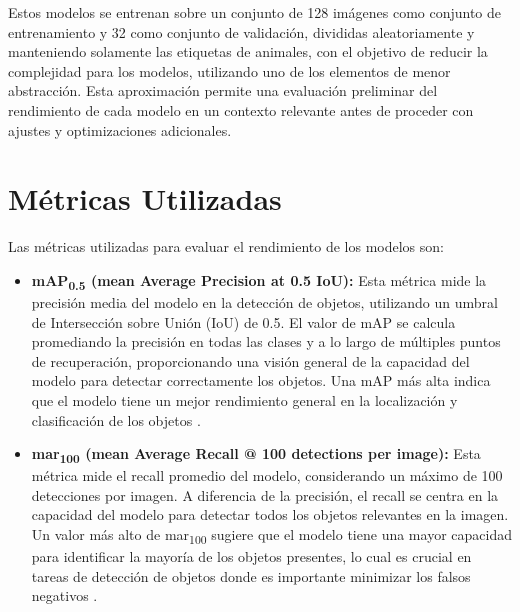Estos modelos se entrenan sobre un conjunto de 128 imágenes como conjunto de entrenamiento y 32 como conjunto de validación, divididas aleatoriamente y manteniendo solamente las etiquetas de animales, con el objetivo de reducir la complejidad para los modelos, utilizando uno de los elementos de menor abstracción.
Esta aproximación permite una evaluación preliminar del rendimiento de cada modelo en un contexto relevante antes de proceder con ajustes y optimizaciones adicionales.

\section{Métricas Utilizadas}

Las métricas utilizadas para evaluar el rendimiento de los modelos son:

\begin{itemize}
    \item \textbf{mAP\textsubscript{0.5} (mean Average Precision at 0.5 IoU):}
    Esta métrica mide la precisión media del modelo en la detección de objetos, utilizando un umbral de Intersección sobre Unión (IoU) de 0.5.
    El valor de mAP se calcula promediando la precisión en todas las clases y a lo largo de múltiples puntos de recuperación, proporcionando una visión general de la capacidad del modelo para detectar correctamente los objetos.
    Una mAP más alta indica que el modelo tiene un mejor rendimiento general en la localización y clasificación de los objetos \cite{lin2014microsoft,everingham2010pascal}.

    \item \textbf{mar\textsubscript{100} (mean Average Recall @ 100 detections per image):}
    Esta métrica mide el recall promedio del modelo, considerando un máximo de 100 detecciones por imagen.
    A diferencia de la precisión, el recall se centra en la capacidad del modelo para detectar todos los objetos relevantes en la imagen. Un valor más alto de mar\textsubscript{100} sugiere que el modelo tiene una mayor capacidad para identificar la mayoría de los objetos presentes, lo cual es crucial en tareas de detección de objetos donde es importante minimizar los falsos negativos \cite{cocoEval2015}.
\end{itemize}

